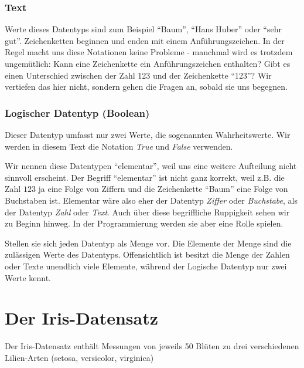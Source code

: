 \documentclass[
  oneside]{book}
\begin{document}
\hypertarget{text}{%
\subsubsection*{\texorpdfstring{\textbf{Text}}{Text}}\label{text}}

Werte dieses Datentyps sind zum Beispiel ``Baum'', ``Hans Huber'' oder ``sehr gut''. Zeichenketten beginnen und enden mit einem Anführungszeichen. In der Regel macht uns diese Notationen keine Probleme - manchmal wird es trotzdem ungemütlich: Kann eine Zeichenkette ein Anführungszeichen enthalten? Gibt es einen Unterschied zwischen der Zahl 123 und der Zeichenkette ``123''? Wir vertiefen das hier nicht, sondern gehen die Fragen an, sobald sie uns begegnen.

\hypertarget{logischer-datentyp-boolean}{%
\subsubsection*{Logischer Datentyp (Boolean)}\label{logischer-datentyp-boolean}}

Dieser Datentyp umfasst nur zwei Werte, die sogenannten Wahrheitswerte. Wir werden in diesem Text die Notation \emph{True} und \emph{False} verwenden.

Wir nennen diese Datentypen ``elementar'', weil uns eine weitere Aufteilung nicht sinnvoll erscheint. Der Begriff ``elementar'' ist nicht ganz korrekt, weil z.B. die Zahl \(123\) ja eine Folge von Ziffern und die Zeichenkette ``Baum'' eine Folge von Buchstaben ist. Elementar wäre also eher der Datentyp \emph{Ziffer} oder \emph{Buchstabe}, als der Datentyp \emph{Zahl} oder \emph{Text}. Auch über diese begriffliche Ruppigkeit sehen wir zu Beginn hinweg. In der Programmierung werden sie aber eine Rolle spielen.

Stellen sie sich jeden Datentyp als Menge vor. Die Elemente der Menge sind die zulässigen Werte des Datentyps. Offensichtlich ist besitzt die Menge der Zahlen oder Texte unendlich viele Elemente, während der Logische Datentyp nur zwei Werte kennt.

\hypertarget{der-iris-datensatz}{%
\section{Der Iris-Datensatz}\label{der-iris-datensatz}}

Der Iris-Datensatz enthält Messungen von jeweils 50 Blüten zu drei verschiedenen Lilien-Arten (setosa, versicolor, virginica)
\end{document}
